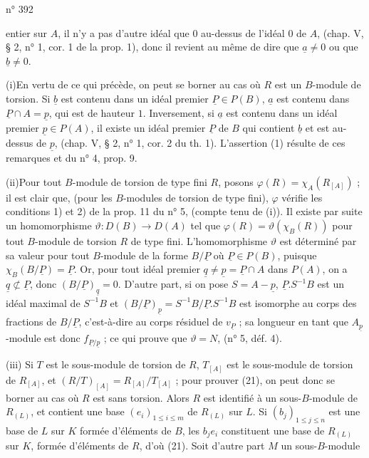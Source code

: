 \hfill n° 392

entier sur $A$, il n'y a pas d'autre idéal que $0$ au-dessus de l'idéal $0$ de $A$, (chap. V, § 2, n° 1, cor. 1 de la prop. 1), donc il revient au même de dire que $\underline{a} \ne 0$ ou que $\underline{b} \ne 0$.

(i)\quad En vertu de ce qui précède, on peut se borner au cas où $R$ est un $B$-module de torsion. Si $\underline{b}$ est contenu dans un idéal premier $\underline{P} \in P(B)$, $\underline{a}$ est contenu dans $\underline{P} \cap A = \underline{p}$, qui est de hauteur $1$. Inversement, si $\underline{a}$ est contenu dans un idéal premier $\underline{p} \in P(A)$, il existe un idéal premier $\underline{P}$ de $B$ qui contient $\underline{b}$ et est au-dessus de $\underline{p}$, (chap. V, § 2, n° 1, cor. 2 du th. 1). L'assertion (1) résulte de ces remarques et du n° 4, prop. 9.

(ii)\quad Pour tout $B$-module de torsion de type fini $R$, posons $\varphi(R) = \chi_A(R_{[A]})$ ; il est clair que, (pour les $B$-modules de torsion de type fini), $\varphi$ vérifie les conditions 1) et 2) de la prop. 11 du n° 5, (compte tenu de (i)). Il existe par suite un homomorphisme $\vartheta : D(B) \longrightarrow D(A)$ tel que $\varphi(R) = \vartheta(\chi_B(R))$ pour tout $B$-module de torsion $R$ de type fini. L'homomorphisme $\vartheta$ est déterminé par sa valeur pour tout $B$-module de la forme $B/\underline{P}$ où $\underline{P} \in P(B)$, puisque $\chi_B(B/\underline{P}) = \underline{P}$. Or, pour tout idéal premier $\underline{q} \ne \underline{p} = \underline{P} \cap A$ dans $P(A)$, on a $\underline{q} \not\subset \underline{P}$, donc $(B/\underline{P})_{\underline{q}} = 0$. D'autre part, si on pose $S = A - \underline{p}$, $\underline{P}.S^{-1}B$ est un idéal maximal de $S^{-1}B$ et $(B/\underline{P})_{\underline{p}} = S^{-1}B/\underline{P}.S^{-1}B$ est isomorphe au corps des fractions de $B/\underline{P}$, c'est-à-dire au corps résiduel de $v_{\underline{P}}$ ; sa longueur en tant que $A_{\underline{p}}$-module est donc $f_{\underline{P}/\underline{p}}$ ; ce qui prouve que $\vartheta = N$, (n° 5, déf. 4).

(iii) Si $T$ est le sous-module de torsion de $R$, $T_{[A]}$ est le sous-module de torsion de $R_{[A]}$, et $(R/T)_{[A]} = R_{[A]}/T_{[A]}$ ; pour prouver (21), on peut donc se borner au cas où $R$ est sans torsion. Alors $R$ est identifié à un sous-$B$-module de $R_{(L)}$, et contient une base $(e_i)_{1\leq i\leq m}$ de $R_{(L)}$ sur $L$. Si $(b_j)_{1\leq j\leq n}$ est une base de $L$ sur $K$ formée d'éléments de $B$, les $b_j e_i$ constituent une base de $R_{(L)}$ sur $K$, formée d'éléments de $R$, d'où (21). Soit d'autre part $M$ un sous-$B$-module

